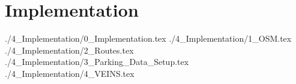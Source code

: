 \chapter{Implementation}
{./4_Implementation/0_Implementation.tex}
{./4_Implementation/1_OSM.tex}
{./4_Implementation/2_Routes.tex}
{./4_Implementation/3_Parking_Data_Setup.tex}
{./4_Implementation/4_VEINS.tex}